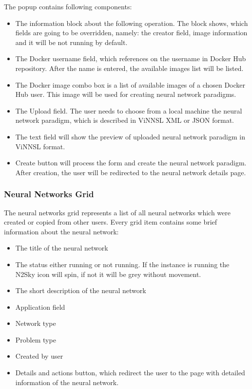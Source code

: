 \begin{itemize}
The popup contains following components:
\begin{itemize}
\item The information block about the following operation. The block shows, which fields are going to be overridden, namely: the creator field, image information and it will be not running by default. 
\item The Docker username field, which references on the username in Docker Hub repository. After the name is entered, the available images list will be listed. 
\item The Docker image combo box is a list of available images of a chosen Docker Hub user.  This image will be used for creating neural network paradigms.
\item The Upload field. The user needs to choose from a local machine the neural network paradigm, which is described in ViNNSL XML or JSON format.
\item The text field will show the preview of uploaded neural network paradigm in ViNNSL format.
\item Create button will process the form and create the neural network paradigm. After creation, the user will be redirected to the neural network details page. 
\end{itemize}

\subsubsection{Neural Networks Grid}

The neural networks grid represents a list of all neural networks which were created or copied from other users. Every grid item contains some brief information about the neural network:
\begin{itemize}
\item The title of the neural network
\item The status either running or not running. If the instance is running the N2Sky icon will spin, if not it will be grey without movement. 
\item The short description of the neural network
\item Application field
\item Network type
\item Problem type
\item Created by user
\item Details and actions button, which redirect the user to the page with detailed information of the neural network. 
\end{itemize}


\end{itemize}

